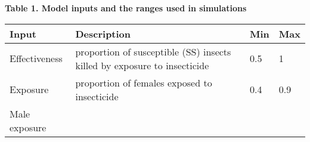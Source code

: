 \documentclass[11pt,]{article}
\begin{document}
\textbf{Table 1. Model inputs and the ranges used in simulations}

\begin{longtable}[]{@{}llll@{}}
\toprule
\begin{minipage}[b]{0.28\columnwidth}\raggedright\strut
Input\strut
\end{minipage} & \begin{minipage}[b]{0.46\columnwidth}\raggedright\strut
Description\strut
\end{minipage} & \begin{minipage}[b]{0.07\columnwidth}\raggedright\strut
Min\strut
\end{minipage} & \begin{minipage}[b]{0.07\columnwidth}\raggedright\strut
Max\strut
\end{minipage}\tabularnewline
\midrule
\endhead
\begin{minipage}[t]{0.28\columnwidth}\raggedright\strut
Effectiveness\strut
\end{minipage} & \begin{minipage}[t]{0.46\columnwidth}\raggedright\strut
proportion of susceptible (SS) insects killed by exposure to
insecticide\strut
\end{minipage} & \begin{minipage}[t]{0.07\columnwidth}\raggedright\strut
0.5\strut
\end{minipage} & \begin{minipage}[t]{0.07\columnwidth}\raggedright\strut
1\strut
\end{minipage}\tabularnewline
\begin{minipage}[t]{0.28\columnwidth}\raggedright\strut
Exposure\strut
\end{minipage} & \begin{minipage}[t]{0.46\columnwidth}\raggedright\strut
proportion of females exposed to insecticide\strut
\end{minipage} & \begin{minipage}[t]{0.07\columnwidth}\raggedright\strut
0.4\strut
\end{minipage} & \begin{minipage}[t]{0.07\columnwidth}\raggedright\strut
0.9\strut
\end{minipage}\tabularnewline
\begin{minipage}[t]{0.28\columnwidth}\raggedright\strut
Male exposure\strut
\end{minipage} & \begin{minipage}[t]{0.46\columnwidth}\raggedright\strut

\end{minipage}
\end{longtable}
\end{document}
